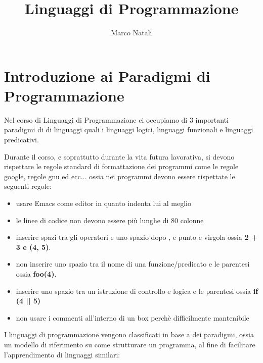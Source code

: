 \documentclass[a4paper]{report}
\begin{document}
\title{Linguaggi di Programmazione}
\author{Marco Natali}
\date{}%
\maketitle

\tableofcontents

\chapter{Introduzione ai Paradigmi di Programmazione}
Nel corso di Linguaggi di Programmazione ci occupiamo di 3 importanti paradigmi di 
di linguaggi quali i linguaggi logici, linguaggi funzionali e linguaggi predicativi.

Durante il corso, e soprattutto durante la vita futura lavorativa, si devono rispettare le regole
standard di formattazione dei programmi come le regole google, regole gnu ed ecc... ossia nei programmi
devono essere rispettate le seguenti regole:
\begin{itemize}
\item usare Emacs come editor in quanto indenta lui al meglio
\item le linee di codice non devono essere più lunghe di 80 colonne
\item inserire spazi tra gli operatori e uno spazio dopo , e punto e virgola  ossia \textbf{2 + 3 e (4, 5)}.
\item non inserire uno spazio tra il nome di una funzione/predicato e le parentesi ossia \textbf{foo(4)}.
\item inserire uno spazio tra un istruzione di controllo e logica  e le parentesi ossia \textbf{if (4 || 5)}
\item non usare i commenti all'interno di un box perchè difficilmente mantenibile
\end{itemize}
I linguaggi di programmazione vengono classificati in base a dei paradigmi, ossia un modello di riferimento
su come strutturare un programma, al fine di facilitare l'apprendimento di linguaggi similari:
\end{document}
